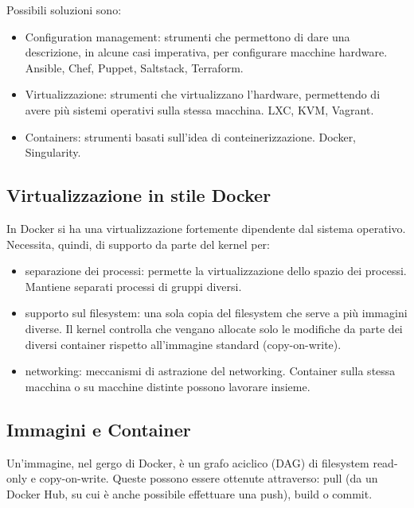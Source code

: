 \noindent Possibili soluzioni sono:

\begin{itemize}
    \item Configuration management: strumenti che permettono di dare una descrizione, in alcune casi imperativa, per configurare macchine hardware. Ansible, Chef, Puppet, Saltstack, Terraform.
    \item Virtualizzazione: strumenti che virtualizzano l'hardware, permettendo di avere più sistemi operativi sulla stessa macchina. LXC, KVM, Vagrant.
    \item Containers: strumenti basati sull'idea di conteinerizzazione. Docker, Singularity.
\end{itemize}

\subsection{Virtualizzazione in stile Docker}

In Docker si ha una virtualizzazione fortemente dipendente dal sistema operativo. Necessita, quindi, di supporto da parte del kernel per:
\begin{itemize}
    \item separazione dei processi: permette la virtualizzazione dello spazio dei processi. Mantiene separati processi di gruppi diversi.
    \item supporto sul filesystem: una sola copia del filesystem che serve a più immagini diverse. Il kernel controlla che vengano allocate solo le modifiche da parte dei diversi container rispetto all'immagine standard (copy-on-write).
    \item networking: meccanismi di astrazione del networking. Container sulla stessa macchina o su macchine distinte possono lavorare insieme.
\end{itemize}


\subsection{Immagini e Container}

Un'immagine, nel gergo di Docker, è un grafo aciclico (DAG) di filesystem read-only e copy-on-write. Queste possono essere ottenute attraverso: pull (da un Docker Hub, su cui è anche possibile effettuare una push), build o commit.

